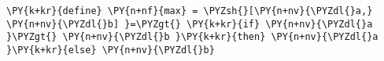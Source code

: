 \begin{Verbatim}[commandchars=\\\{\}]
\PY{k+kr}{define} \PY{n+nf}{max} = \PYZsh{}[\PY{n+nv}{\PYZdl{}a,} \PY{n+nv}{\PYZdl{}b] }=\PYZgt{} \PY{k+kr}{if} \PY{n+nv}{\PYZdl{}a }\PYZgt{} \PY{n+nv}{\PYZdl{}b }\PY{k+kr}{then} \PY{n+nv}{\PYZdl{}a }\PY{k+kr}{else} \PY{n+nv}{\PYZdl{}b}
\end{Verbatim}
